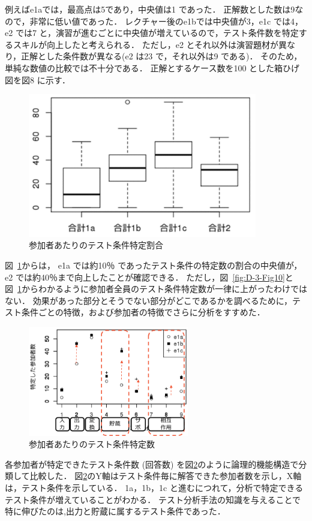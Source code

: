 例えばe1aでは，最高点は5であり，中央値は1 であった．
正解数とした数は9なので，非常に低い値であった．
レクチャー後のe1bでは中央値が3，e1c では4，e2 では7 と，演習が進むごとに中央値が増えているので，テスト条件数を特定するスキルが向上したと考えられる．
ただし，e2 とそれ以外は演習題材が異なり，正解とした条件数が異なる(e2 は23 で，それ以外は9 である)．
そのため，単純な数値の比較では不十分である．
正解とするケース数を100 とした箱ひげ図を図8 に示す．
\begin{figure}[htbp]
  \begin{center}
  \includegraphics[width=10cm]{./image/D-3-Fig11.png}
  \caption{参加者あたりのテスト条件特定割合}
  \label{fig:D-3-Fig11}
  \end{center}
   \end{figure}

図~\ref{fig:D-3-Fig11}からは， e1a では約10％ であったテスト条件の特定数の割合の中央値が，e2 では約40％まで向上したことが確認できる．
ただし，図~\ref{fig:D-3-Fig10}と図~\ref{fig:D-3-Fig11}からわかるように参加者全員のテスト条件特定数が一律に上がったわけではない．
効果があった部分とそうでない部分がどこであるかを調べるために，テスト条件ごとの特徴，および参加者の特徴でさらに分析をすすめた．

\begin{figure}[htbp]
  \begin{center}
  \includegraphics[width=7cm]{./image/D-3-Fig12-1.png}
  \caption{参加者あたりのテスト条件特定数}
  \label{fig:D-3-Fig12-1}
  \end{center}
\end{figure}
各参加者が特定できたテスト条件数 (回答数) を図\ref{fig:D-3-Fig12-1}のように論理的機能構造で分類して比較した．
図\ref{fig:D-3-Fig12-1}のY軸はテスト条件毎に解答できた参加者数を示し，X軸は，テスト条件を示している．
1a，1b，1c と進むにつれて，分析で特定できるテスト条件が増えていることがわかる．
テスト分析手法の知識を与えることで特に伸びたのは,出力と貯蔵に属するテスト条件であった．

